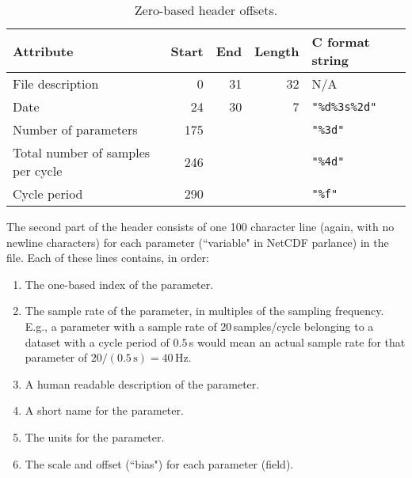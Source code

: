 \documentclass{report}
\begin{document}
\begin{table}[H]
\centering
\caption{Zero-based header offsets.}
\label{Tbl.HeaderOffsets}
\begin{tabular}{lrrrl}
Attribute                         & Start & End & Length & C format string \\
\hline
File description                  & 0     & 31  & 32     & N/A \\
Date                              & 24    & 30  & 7      & \texttt{"\%d\%3s\%2d"} \\
Number of parameters              & 175   &     &        & \texttt{"\%3d"} \\
Total number of samples per cycle & 246   &     &        & \texttt{"\%4d"} \\
Cycle period                      & 290   &     &        & \texttt{"\%f"}
\end{tabular}
\end{table}

The second part of the header consists of one 100 character line (again, with no newline characters) for each parameter (``variable" in NetCDF parlance) in the file. Each of these lines contains, in order:
\begin{enumerate}
	\item The one-based index of the parameter.
	\item The sample rate of the parameter, in multiples of the sampling
	      frequency. E.g., a parameter with a sample rate of
	      \(20\)\,samples/cycle belonging to a dataset with a cycle period
	      of \(0.5\)\,s would mean an actual
	      sample rate for that parameter of \(20/(0.5\,\mathrm{s}) = 40\,\text{Hz}\).
	\item A human readable description of the parameter.
	\item A short name for the parameter.
	\item The units for the parameter.
	\item The scale and offset (``bias") for each parameter (field).
\end{enumerate}
\end{document}
